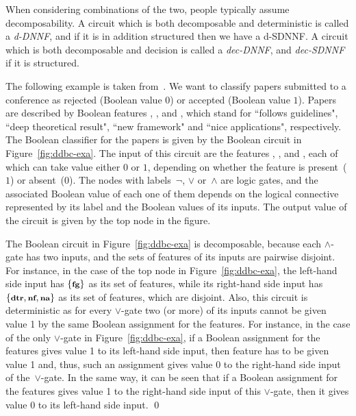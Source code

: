When considering combinations of the two, people typically assume decomposability. 
A circuit which is both decomposable and deterministic is called a \emph{d-DNNF}, and if it is in addition structured then we have a d-SDNNF. 
 A circuit which is both decomposable and decision is called a \emph{dec-DNNF}, and \emph{dec-SDNNF} if it is structured.


\begin{example} \label{ex:class}
The following example is taken from~\cite{arenas2023complexity}.
   We want to classify papers submitted to a conference as rejected
(Boolean value $0$) or accepted (Boolean value $1$). Papers are
described by Boolean features , ,  and ,
which stand for ``follows guidelines", ``deep theoretical result", ``new
framework" and ``nice applications", respectively.  The Boolean classifier
for the papers is given by the Boolean circuit in
Figure~\ref{fig:ddbc-exa}. The input of this circuit are the
features , ,  and , each of which
can take value either $0$ or $1$, depending on whether the feature is
present~($1$) or absent~($0$). The nodes with labels~$\neg$, $\lor$ or~$\land$ are logic gates, and the associated Boolean value of
each one of them depends on the logical connective represented by its
label and the Boolean values of its inputs. The output
value
of the circuit is given by
the top node in the figure.

The Boolean circuit in
Figure~\ref{fig:ddbc-exa} is decomposable, because each
$\land$-gate has two inputs, and the sets of features of its inputs are pairwise
disjoint. For instance, in the case of the top node in
Figure~\ref{fig:ddbc-exa}, the left-hand side input has
$\{\mbox{\bf \footnotesize fg}\}$ as its set of features, while its right-hand side
input has $\{\mbox{\bf \footnotesize dtr}, \mbox{\bf \footnotesize nf}, \mbox{\bf \footnotesize na}\}$ as its set of
features, which are disjoint. Also, this circuit is deterministic as 
for every $\lor$-gate two (or more) of its inputs cannot be given
value 1 by the same Boolean assignment for the features. For instance,
in the case of the only $\lor$-gate in Figure~\ref{fig:ddbc-exa}, if a
Boolean assignment for the features gives value 1 to its left-hand side
input, then feature  has to be given value 1 and, thus, such
an assignment gives value $0$ to the right-hand side input of the~$\lor$-gate.
In the same way, it can be seen that if a Boolean assignment for the features
gives value 1 to the right-hand side input of this $\lor$-gate, then it gives
value $0$ to its left-hand side input.
\qed
\end{example}

